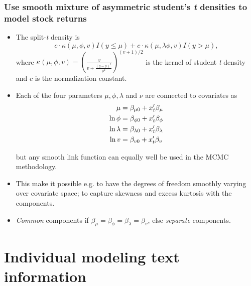 \documentclass{beamer}
\begin{document}
\begin{frame}
  \frametitle{Use smooth mixture of asymmetric student's {\em t} densities to model stock returns}
  \begin{itemize}
  \item The split-\emph{t} density is
    \[
      c \cdot \kappa \left( {\mu ,\phi ,v} \right)I\left( {y \leq \mu } \right) + c \cdot \kappa
      \left( {\mu ,\lambda \phi ,v} \right)I\left( {y > \mu } \right),
    \]
    where $ \kappa \left( {\mu ,\phi ,v} \right) = \left( {\frac{v}
        {{v + \frac{{\left( {y - \mu } \right)^2 }}
            {{\phi ^2 }}}}} \right)^{\left( {v + 1} \right)/2} $ is the kernel of student \emph{t}
    density and $c$ is the normalization constant.

  \item  Each of the four parameters $\mu,\phi,\lambda$ and $\nu$ are connected
    to covariates as
    \[
      \begin{split}
        \mu  &= \beta _{\mu 0}  + x_t '\beta _\mu   \hfill \\
        \ln \phi  &= \beta _{\phi 0}  + x_t '\beta _\phi   \hfill \\
        \ln \lambda & = \beta _{\lambda 0}  + x_t '\beta _\lambda   \hfill \\
        \ln v &= \beta _{v0}  + x_t '\beta _v  \hfill \\
      \end{split}
    \]

    but any smooth link function can equally well be used in the MCMC
    methodology.
  \item This make it possible e.g. to have the degrees of freedom smoothly varying over
    covariate space; to capture skewness and excess kurtosis with the components.
  \item \emph{Common} components if $\beta _\mu=\beta _\phi=\beta _\lambda=\beta _v$, else
    \emph{separate} components.
  \end{itemize}
\end{frame}

\section{Individual modeling text information}
\end{document}
